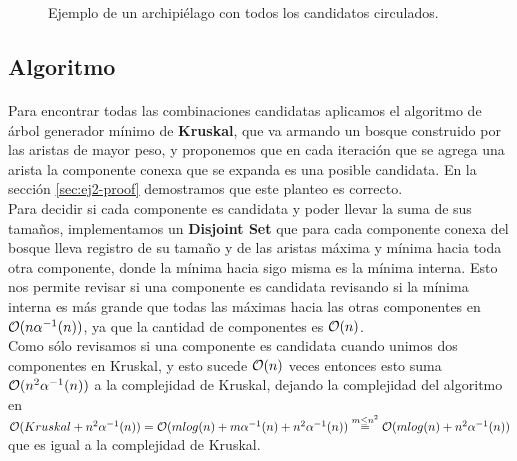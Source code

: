\documentclass[../main.tex]{subfiles}
\begin{document}
\begin{figure}[H]
\centering

  
\caption{Ejemplo de un archipiélago con todos los candidatos circulados.}
\label{fig:ej2-ex}
\end{figure}

\subsection{Algoritmo}
\label{sec:ej2-algorithm}
\paragraph{} Para encontrar todas las combinaciones candidatas aplicamos el algoritmo de árbol generador mínimo de \textbf{Kruskal}, que va armando un bosque construido por las aristas de mayor peso, y proponemos que en cada iteración que se agrega una arista la componente conexa que se expanda es una posible candidata. En la sección \ref{sec:ej2-proof} demostramos que este planteo es correcto. \\
Para decidir si cada componente es candidata y poder llevar la suma de sus tamaños, implementamos un \textbf{Disjoint Set} que para cada componente conexa del bosque lleva registro de su tamaño y de las aristas máxima y mínima hacia toda otra componente, donde la mínima hacia sigo misma es la mínima interna. Esto nos permite revisar si una componente es candidata revisando si la mínima interna es más grande que todas las máximas hacia las otras componentes en \(\mathcal{O}(n\alpha^{-1}(n))\), ya que la cantidad de componentes es \(\mathcal{O}(n)\). \\
Como sólo revisamos si una componente es candidata cuando unimos dos componentes en Kruskal, y esto sucede \(\mathcal{O}(n)\) veces entonces esto suma \(\mathcal{O}(n^{2}\alpha^{-1}(n))\) a la complejidad de Kruskal, dejando la complejidad del algoritmo en \(\mathcal{O}(Kruskal + n^{2}\alpha^{-1}(n)) = \mathcal{O}(mlog(n) + m\alpha^{-1}(n) +n^{2}\alpha^{-1}(n)) \overset{m \leq n^{2}}{=} \mathcal{O}(mlog(n) + n^{2}\alpha^{-1}(n))\) que es igual a la complejidad de Kruskal.
\end{document}

